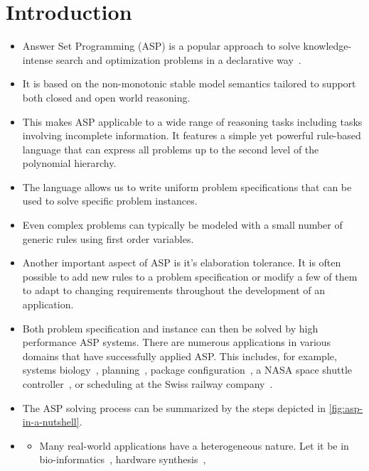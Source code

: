 \chapter{Introduction}\label{sec:introduction}

\begin{itemize}
  \item 
  Answer Set Programming (ASP) is a popular approach
  to solve knowledge-intense search and optimization problems in a declarative way~\cites{baral02a,gekakasc12a}.
  \item
  It is based on the non-monotonic stable model semantics
  tailored to support both closed and open world reasoning.
  \item 
  This makes ASP applicable to a wide range of reasoning tasks including tasks involving incomplete information.
  It features a simple yet powerful rule-based language
  that can express all problems up to the second level of the polynomial hierarchy.
  \item
  The language allows us to write uniform problem specifications that can be used to solve specific problem instances.
  \item
  Even complex problems can typically be modeled with a small number of generic rules using first order variables.
  \item
  Another important aspect of ASP is it's elaboration tolerance.
  It is often possible to add new rules to a problem specification or modify a few of them
  to adapt to changing requirements throughout the development of an application.
  \item 
  Both problem specification and instance can then be solved by high performance ASP systems.
  There are numerous applications in various domains that have successfully applied {ASP}.
  This includes, for example,  systems biology~\cite{kascsivi13a},
  planning~\cite{gekaknsc11a},
  package configuration~\cite{gekasc11c},
  a NASA space shuttle controller~\cite{nobagewaba01a}, or
  scheduling at the Swiss railway company~\cite{abjoossctowa21a}.
  \item
  
  The ASP solving process can be summarized by the steps depicted in \cref{fig:asp-in-a-nutshell}.
  \item \cite{cafascwa20a}
  \begin{itemize}
    \item Many real-world applications have a heterogeneous nature.
    Let it be in
    bio-informatics~\cite{frscscsiwa18a},
    hardware synthesis~\cite{newascha18b},

\end{itemize}
\end{itemize}
